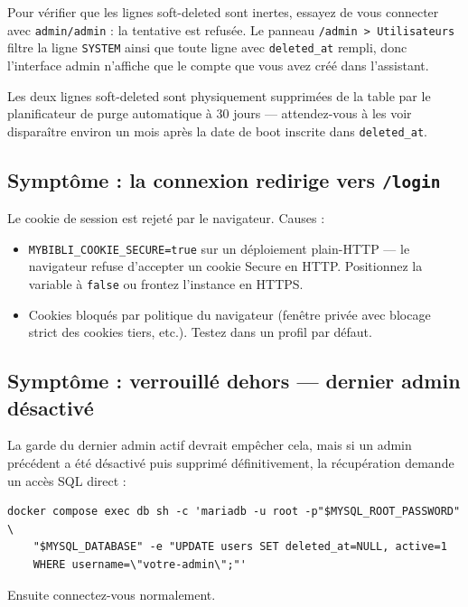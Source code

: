 \begin{tip}
Pour vérifier que les lignes soft-deleted sont inertes, essayez de
vous connecter avec \texttt{admin/admin} : la tentative est
refusée. Le panneau \texttt{/admin > Utilisateurs} filtre la ligne
\texttt{SYSTEM} ainsi que toute ligne avec \texttt{deleted\_at}
rempli, donc l'interface admin n'affiche que le compte que vous
avez créé dans l'assistant.
\end{tip}

Les deux lignes soft-deleted sont physiquement supprimées de la
table par le planificateur de purge automatique à 30 jours —
attendez-vous à les voir disparaître environ un mois après la date
de boot inscrite dans \texttt{deleted\_at}.

\subsection*{Symptôme : la connexion redirige vers \texttt{/login}}

Le cookie de session est rejeté par le navigateur. Causes :

\begin{itemize}
  \item \texttt{MYBIBLI\_COOKIE\_SECURE=true} sur un déploiement
        plain-HTTP — le navigateur refuse d'accepter un cookie
        Secure en HTTP. Positionnez la variable à \texttt{false}
        ou frontez l'instance en HTTPS.
  \item Cookies bloqués par politique du navigateur (fenêtre
        privée avec blocage strict des cookies tiers, etc.).
        Testez dans un profil par défaut.
\end{itemize}

\subsection*{Symptôme : verrouillé dehors — dernier admin désactivé}

La garde du dernier admin actif devrait empêcher cela, mais si un
admin précédent a été désactivé puis supprimé définitivement, la
récupération demande un accès SQL direct :

\begin{lstlisting}
docker compose exec db sh -c 'mariadb -u root -p"$MYSQL_ROOT_PASSWORD" \
    "$MYSQL_DATABASE" -e "UPDATE users SET deleted_at=NULL, active=1
    WHERE username=\"votre-admin\";"'
\end{lstlisting}

Ensuite connectez-vous normalement.

